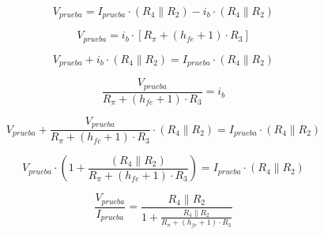 \documentclass[12pt,letterpaper]{article}     %
\begin{document}
\begin{minipage}{.5\textwidth}
	\begin{center}
		\begin{equation}
			V_{prueba}=
			I_{prueba}\cdot
			(R_4\parallel
			R_2)-
			i_b\cdot
			(R_4\parallel
			R_2)
		\end{equation}
	\end{center}
\end{minipage}%
\begin{minipage}{.4\textwidth}
	\begin{center}
		\begin{equation}
			V_{prueba}=
			i_b\cdot
			[R_{\pi}+
			(h_{fe}+1)\cdot
			R_3]
		\end{equation}
	\end{center}
\end{minipage}

\begin{minipage}{.5\textwidth}
	\begin{center}
		\begin{equation}
			V_{prueba} +
			i_b\cdot
			(R_4\parallel
			R_2)=
			I_{prueba}\cdot
			(R_4\parallel
			R_2)
		\end{equation}
	\end{center}
\end{minipage}%
\begin{minipage}{.4\textwidth}
	\begin{center}
		\begin{equation}
			\frac{
				V_{prueba}
			}{
				R_{\pi}+
				(h_{fe}+1)\cdot
				R_3
			}
			= i_b
		\end{equation}
	\end{center}
\end{minipage}

\begin{equation}
	V_{prueba} +
	\frac{
		V_{prueba}
	}{
		R_{\pi}+
		(h_{fe}+1)\cdot
		R_3
	}
	\cdot
	(R_4\parallel
	R_2)
	=
	I_{prueba}\cdot
	(R_4\parallel
	R_2)
\end{equation}

\begin{equation}
	V_{prueba} \cdot
	(1+
	\frac{
		(R_4\parallel
		R_2)
	}{
		R_{\pi}+
		(h_{fe}+1)\cdot
		R_3
	})
	=
	I_{prueba}\cdot
	(R_4\parallel
	R_2)
\end{equation}

\begin{equation}
	\frac{
		V_{prueba} 
	}{
		I_{prueba}
	}
	=
	\frac{
		R_4\parallel
		R_2
	}{
		1+
		\frac{
			R_4\parallel
			R_2
		}{
			R_{\pi}+
			(h_{fe}+1)\cdot
			R_3
		}
	}
\end{equation}
\end{document}
